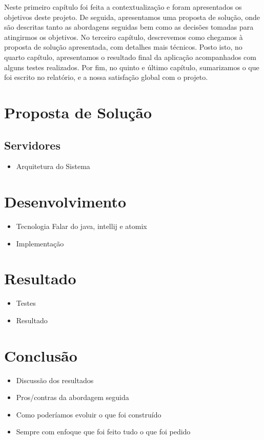 \documentclass[12pt, a4paper]{report}
\begin{document}
Neste primeiro capítulo foi feita a contextualização e foram apresentados os objetivos deste projeto.
De seguida, apresentamos uma proposta de solução, onde são descritas tanto as abordagens seguidas bem como as decisões tomadas para atingirmos os objetivos.
No terceiro capítulo, descrevemos como chegamos à proposta de solução apresentada, com detalhes mais técnicos.
Posto isto, no quarto capítulo, apresentamos o resultado final da aplicação acompanhados com alguns testes realizados.
Por fim, no quinto e último capítulo, sumarizamos o que foi escrito no relatório, e a nossa satisfação global com o projeto.


\chapter{Proposta de Solução}
\section{Servidores}




\begin{itemize}
    \item Arquitetura do Sistema
\end{itemize}


\chapter{Desenvolvimento}
\begin{itemize}
    \item Tecnologia
    Falar do java, intellij e atomix
    \item Implementação
    
\end{itemize}


\chapter{Resultado}
\begin{itemize}
    \item Testes
    \item Resultado
\end{itemize}


\chapter{Conclusão}
\begin{itemize}
    \item Discussão dos resultados
    \item Pros/contras da abordagem seguida
    \item Como poderíamos evoluir o que foi construído
    \item Sempre com enfoque que foi feito tudo o que foi pedido
\end{itemize}
\end{document}
